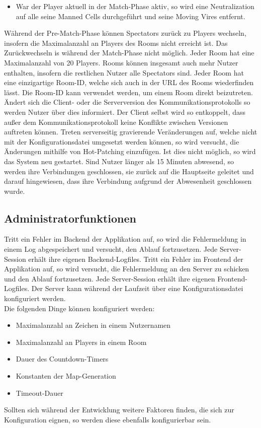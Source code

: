 \begin{description}
\begin{itemize}
			\item War der Player aktuell in der Match-Phase aktiv, so wird eine Neutralization auf alle seine Manned Cells durchgeführt und seine Moving Vires entfernt.
		\end{itemize}
		Während der Pre-Match-Phase können Spectators zurück zu Players wechseln, insofern die Maximalanzahl an Players des Rooms nicht erreicht ist. Das Zurückwechseln is während der Match-Phase nicht möglich.
		Jeder Room hat eine Maximalanzahl von 20 Players. Rooms können insgesamt auch mehr Nutzer enthalten, insofern die restlichen Nutzer alle Spectators sind.
		Jeder Room hat eine einzigartige Room-ID, welche sich auch in der URL des Rooms wiederfinden lässt. Die Room-ID kann verwendet werden, um einem Room direkt beizutreten.
		Ändert sich die Client- oder die Serverversion des Kommunikationsprotokolls so werden Nutzer über dies informiert. Der Client selbst wird so entkoppelt, dass außer dem Kommunikationsprotokoll keine Konflikte zwischen Versionen auftreten können. Treten serverseitig gravierende Veränderungen auf, welche nicht mit der Konfigurationsdatei umgesetzt werden können, so wird versucht, die Änderungen mithilfe von Hot-Patching einzufügen. Ist dies nicht möglich, so wird das System neu gestartet.
		Sind Nutzer länger als 15 Minuten abwesend, so werden ihre Verbindungen geschlossen, sie zurück auf die Hauptseite geleitet und darauf hingewiesen, dass ihre Verbindung aufgrund der Abwesenheit geschlossen wurde.
\end{description}

\subsection{Administratorfunktionen}
\begin{description}
		Tritt ein Fehler im Backend der Applikation auf, so wird die Fehlermeldung in einem Log abgespeichert und versucht, den Ablauf fortzusetzen. Jede Server-Session erhält ihre eigenen Backend-Logfiles.
		Tritt ein Fehler im Frontend der Applikation auf, so wird versucht, die Fehlermeldung an den Server zu schicken und den Ablauf fortzusetzen. Jede Server-Session erhält ihre eigenen Frontend-Logfiles.
		Der Server kann während der Laufzeit über eine Konfigurationsdatei konfiguriert werden. \\
		Die folgenden Dinge können konfiguriert werden:
		\begin{itemize}
			\item Maximalanzahl an Zeichen in einem Nutzernamen
			\item Maximalanzahl an Players in einem Room
			\item Dauer des Countdown-Timers
			\item Konstanten der Map-Generation
			\item Timeout-Dauer
		\end{itemize}
		Sollten sich während der Entwicklung weitere Faktoren finden, die sich zur Konfiguration eignen, so werden diese ebenfalls konfigurierbar sein.
\end{description}